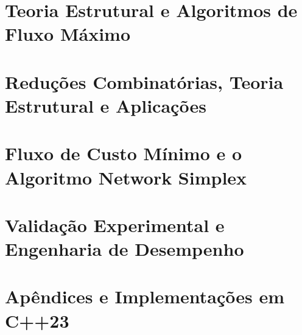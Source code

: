 \documentclass[11pt,a4paper,oneside]{book}
\newcommand{\divisaobloco}[2]{\part{#2}}
\begin{document}
\setlength{\emergencystretch}{3em}



\mainmatter

\divisaobloco{bloco:max_flow}{Teoria Estrutural e Algoritmos de Fluxo Máximo}





\divisaobloco{bloco:aplicacoes}{Reduções Combinatórias, Teoria Estrutural e Aplicações}




\divisaobloco{bloco:min_cost}{Fluxo de Custo Mínimo e o Algoritmo Network Simplex}





\divisaobloco{bloco:benchmarks}{Validação Experimental e Engenharia de Desempenho}




\backmatter




\appendix
\part{Apêndices e Implementações em C++23}


















\end{document}
